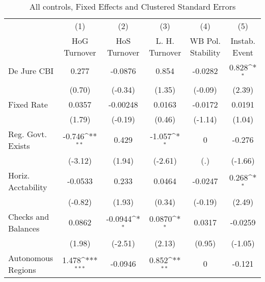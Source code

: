 \begin{table}[htbp]\centering
\def\sym#1{\ifmmode^{#1}\else\(^{#1}\)\fi}
\caption{All controls, Fixed Effects and Clustered Standard Errors \label{fullcmultIndFEDJ}}
\begin{tabular}{l*{5}{c}}
\toprule
                                        &\multicolumn{1}{c}{(1)}&\multicolumn{1}{c}{(2)}&\multicolumn{1}{c}{(3)}&\multicolumn{1}{c}{(4)}&\multicolumn{1}{c}{(5)}\\
                                        &\multicolumn{1}{c}{HoG Turnover}&\multicolumn{1}{c}{HoS Turnover}&\multicolumn{1}{c}{L. H. Turnover}&\multicolumn{1}{c}{WB Pol. Stability}&\multicolumn{1}{c}{Instab. Event}\\
\midrule
De Jure CBI                             &    0.277         &  -0.0876         &    0.854         &  -0.0282         &    0.828\sym{*}  \\
                                        &   (0.70)         &  (-0.34)         &   (1.35)         &  (-0.09)         &   (2.39)         \\
\addlinespace
Fixed Rate                              &   0.0357         & -0.00248         &   0.0163         &  -0.0172         &   0.0191         \\
                                        &   (1.79)         &  (-0.19)         &   (0.46)         &  (-1.14)         &   (1.04)         \\
\addlinespace
Reg. Govt. Exists                       &   -0.746\sym{**} &    0.429         &   -1.057\sym{*}  &        0         &   -0.276         \\
                                        &  (-3.12)         &   (1.94)         &  (-2.61)         &      (.)         &  (-1.66)         \\
\addlinespace
Horiz. Acctability                      &  -0.0533         &    0.233         &   0.0464         &  -0.0247         &    0.268\sym{*}  \\
                                        &  (-0.82)         &   (1.93)         &   (0.34)         &  (-0.19)         &   (2.49)         \\
\addlinespace
Checks and Balances                     &   0.0862         &  -0.0944\sym{*}  &   0.0870\sym{*}  &   0.0317         &  -0.0259         \\
                                        &   (1.98)         &  (-2.51)         &   (2.13)         &   (0.95)         &  (-1.05)         \\
\addlinespace
Autonomous Regions                      &    1.478\sym{***}&  -0.0946         &    0.852\sym{**} &        0         &   -0.121         \\

\end{tabular}
\end{table}
